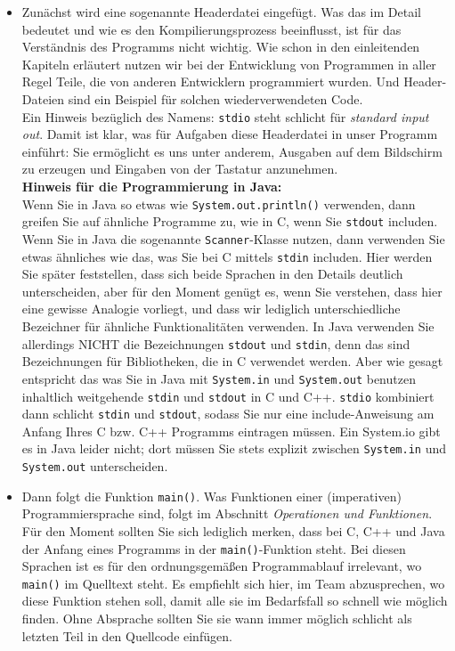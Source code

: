 \begin{itemize}
	\item Zunächst wird eine sogenannte Headerdatei eingefügt. Was das im Detail bedeutet und wie es den Kompilierungsprozess beeinflusst, ist für das Verständnis des Programms nicht wichtig. Wie schon in den einleitenden Kapiteln erläutert nutzen wir bei der Entwicklung von Programmen in aller Regel Teile, die von anderen Entwicklern programmiert wurden. Und Header-Dateien sind ein Beispiel für solchen wiederverwendeten Code.\\
	
	Ein Hinweis bezüglich des Namens: \verb|stdio| steht schlicht für \emph{standard input out}. Damit ist klar, was für Aufgaben diese Headerdatei in unser Programm einführt: Sie ermöglicht es uns unter anderem, Ausgaben auf dem Bildschirm zu erzeugen und Eingaben von der Tastatur anzunehmen.\\
	
	\textbf{Hinweis für die Programmierung in Java:}\\
	
	Wenn Sie in Java so etwas wie \verb|System.out.println()| verwenden, dann greifen Sie auf ähnliche Programme zu, wie in C, wenn Sie \verb|stdout| includen. Wenn Sie in Java die sogenannte \verb|Scanner|-Klasse nutzen, dann verwenden Sie etwas ähnliches wie das, was Sie bei C mittels \verb|stdin| includen. Hier werden Sie später feststellen, dass sich beide Sprachen in den Details deutlich unterscheiden, aber für den Moment genügt es, wenn Sie verstehen, dass hier eine gewisse Analogie vorliegt, und dass wir lediglich unterschiedliche Bezeichner für ähnliche Funktionalitäten verwenden. In Java verwenden Sie allerdings NICHT die Bezeichnungen \verb|stdout| und \verb|stdin|, denn das sind Bezeichnungen für Bibliotheken, die in C verwendet werden. Aber wie gesagt entspricht das was Sie in Java mit \verb|System.in| und \verb|System.out| benutzen inhaltlich weitgehende \verb|stdin| und \verb|stdout| in C und C++. \verb|stdio| kombiniert dann schlicht \verb|stdin| und \verb|stdout|, sodass Sie nur eine include-Anweisung am Anfang Ihres C bzw. C++ Programms eintragen müssen. Ein System.io gibt es in Java leider nicht; dort müssen Sie stets explizit zwischen \verb|System.in| und \verb|System.out| unterscheiden.
	
	\item Dann folgt die Funktion \verb|main()|. Was Funktionen einer (imperativen) Programmiersprache sind, folgt im Abschnitt \emph{Operationen und Funktionen}. Für den Moment sollten Sie sich lediglich merken, dass bei C, C++ und Java der Anfang eines Programms in der \verb|main()|-Funktion steht. Bei diesen Sprachen ist es für den ordnungsgemäßen Programmablauf irrelevant, wo \verb|main()| im Quelltext steht. Es empfiehlt sich hier, im Team abzusprechen, wo diese Funktion stehen soll, damit alle sie im Bedarfsfall so schnell wie möglich finden. Ohne Absprache sollten Sie sie wann immer möglich schlicht als letzten Teil in den Quellcode einfügen.
	

\end{itemize}
